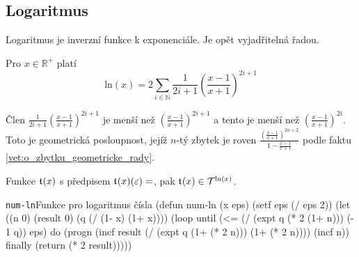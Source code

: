 \subsection{Logaritmus}
Logaritmus je inverzní funkce k exponenciále. Je opět vyjadřitelná řadou.
\begin{fact}
Pro $x\in\mathbb{R}^+$ platí
  \begin{equation}\label{rov:rad:ln}
    \mathrm{ln}(x)=2\sum_{i\in\mathbb{N}}\frac{1}{2i+1}\left(\frac{x-1}{x+1}\right)^{2i+1}
  \end{equation}
\end{fact}

Člen $\frac{1}{2i+1}(\frac{x-1}{x+1})^{2i+1}$ je menší než $(\frac{x-1}{x+1})^{2i+1}$ a  tento je menší než $(\frac{x-1}{x+1})^{2i}$. Toto je geometrická posloupnost, jejíž $n$-tý zbytek je roven $\frac{(\frac{x-1}{x+1})^{2n+2}}{1-\frac{x-1}{x+1}}$ podle faktu \ref{vet:o_zbytku_geometricke_rady}.

\begin{fact}Funkce $\mathfrak{t}^{}(x)$ s předpisem $\mathfrak{t}^{}(x)(\varepsilon)=$,
pak $\mathfrak{t}^{}(x)\in\mathcal{T}^{\mathrm{ln}(x)}$.
\end{fact}
\begin{lispcode}{\texttt{num-ln}}{Funkce pro logaritmus čísla}
(\textcolor{funkcionalni}{defun} \textcolor{pojmenovan}{num-ln} (x eps)
  (\textcolor{vedlejsi}{setf} eps (\textcolor{matematicke}{/} eps 2))
  (\textcolor{vedlejsi}{let} ((n 0) (result 0) (q (\textcolor{matematicke}{/} (\textcolor{matematicke}{1-} x) (\textcolor{matematicke}{1+} x))))
    (\textcolor{funkcionalni}{loop} 
     \textcolor{obarvi}{until} (\textcolor{matematicke}{<=} (\textcolor{matematicke}{/} (\textcolor{matematicke}{expt} q (\textcolor{matematicke}{*} 2 (\textcolor{matematicke}{1+} n))) (\textcolor{matematicke}{-} 1 q))
               eps)
     \textcolor{obarvi}{do} (\textcolor{funkcionalni}{progn} 
          (\textcolor{vedlejsi}{incf} result
                (\textcolor{matematicke}{/} (\textcolor{matematicke}{expt} q (\textcolor{matematicke}{1+} (\textcolor{matematicke}{*} 2 n))) (\textcolor{matematicke}{1+} (\textcolor{matematicke}{*} 2 n))))
          (\textcolor{vedlejsi}{incf} n))
     \textcolor{obarvi}{finally} (\textcolor{funkcionalni}{return} (\textcolor{matematicke}{*} 2 result)))))
\end{lispcode}

